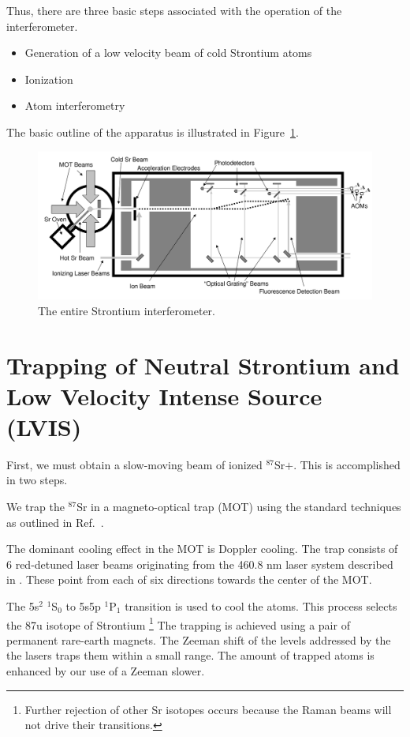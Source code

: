 Thus, there are three basic steps associated with the operation of the interferometer. 
\begin{itemize}
\item Generation of a low velocity beam of cold Strontium atoms   
\item Ionization 
\item Atom interferometry
\end{itemize} 

The basic outline of the apparatus is illustrated in Figure~\ref{fig:IonInterferometer}.

\begin{figure}
\centerline{
\includegraphics[totalheight=0.3\textheight]{interferometer_diagram}
}
\caption[Ion Interferometer]{\label{fig:IonInterferometer}
The entire Strontium interferometer. } 
\end{figure}

\section{Trapping of Neutral Strontium and Low Velocity Intense Source (LVIS)}

First, we must obtain a slow-moving beam of ionized $^{87}$Sr$+$. This is accomplished in two steps. 

We trap the $^{87}$Sr in a magneto-optical trap (MOT) using the standard techniques as outlined in Ref.\ \cite{cjeDiss}. 

The dominant cooling effect in the MOT is Doppler cooling. The trap consists of 6 red-detuned laser beams originating from the 460.8 nm laser system described in \cite{cjeDiss}. These point from each of six directions towards the center of the MOT. 

The 5s$^2$ $^1$S$_0$ to 5s5p $^1$P$_1$ transition is used to cool the atoms. This process selects the 87u isotope of Strontium \footnote{Further rejection of other Sr isotopes occurs because the Raman beams will not drive their transitions.}
The trapping is achieved using a pair of permanent rare-earth magnets. The Zeeman shift of the levels addressed by the the lasers traps them within a small range. The amount of trapped atoms is enhanced by our use of a Zeeman slower. 

